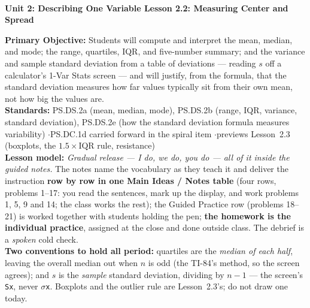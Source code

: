 \documentclass[10pt]{article}
\newcommand{\UnitNumberName}{Unit 2: Describing One Variable \quad}
\newcommand{\LessonNumberName}{Lesson 2.2: Measuring Center and Spread}
\begin{document}
\begin{center}
    {\Large\bfseries \CourseName \\
    {\small\bfseries \UnitNumberName \LessonNumberName}}
\end{center}

\begin{tcolorbox}[colback=frost, colframe=cerulean, boxrule=0.9pt, arc=2mm,
    left=2mm, right=2mm, top=1.5mm, bottom=1.5mm]
    \textbf{Primary Objective:} Students will compute and interpret the mean, median, and mode;
    the range, quartiles, IQR, and five-number summary; and the variance and sample standard
    deviation from a table of deviations --- reading $s$ off a calculator's 1-Var Stats screen
    --- and will justify, from the formula, that the standard deviation measures how far values
    typically sit from their own mean, not how big the values are.
    \\[2pt]
    \textbf{Standards:} PS.DS.2a (mean, median, mode), PS.DS.2b (range, IQR, variance,
    standard deviation), PS.DS.2e (how the standard deviation formula measures variability)
    \quad$\cdot$\quad PS.DC.1d carried forward in the spiral item \quad$\cdot$\quad previews
    Lesson~2.3 (boxplots, the $1.5 \times \text{IQR}$ rule, resistance)
    \\[2pt]
    \textbf{Lesson model:} \emph{Gradual release --- I do, we do, you do --- all of it inside
    the guided notes.} The notes name the vocabulary as they teach it and deliver the
    instruction \textbf{row by row in one Main Ideas / Notes table} (four rows, problems 1--17:
    you read the sentences, mark up the display, and work problems 1, 5, 9 and 14; the class
    works the rest); the Guided Practice row (problems 18--21) is worked together with students
    holding the pen; \textbf{the homework is the individual practice}, assigned at the close
    and done outside class. The debrief is a \emph{spoken} cold check.
    \\[2pt]
    \textbf{Two conventions to hold all period:} quartiles are the \emph{median of each half},
    leaving the overall median out when $n$ is odd (the TI-84's method, so the screen agrees);
    and $s$ is the \emph{sample} standard deviation, dividing by $n - 1$ --- the screen's
    \texttt{Sx}, never \texttt{$\sigma$x}. Boxplots and the outlier rule are Lesson~2.3's; do not
    draw one today.
\end{tcolorbox}
\end{document}
